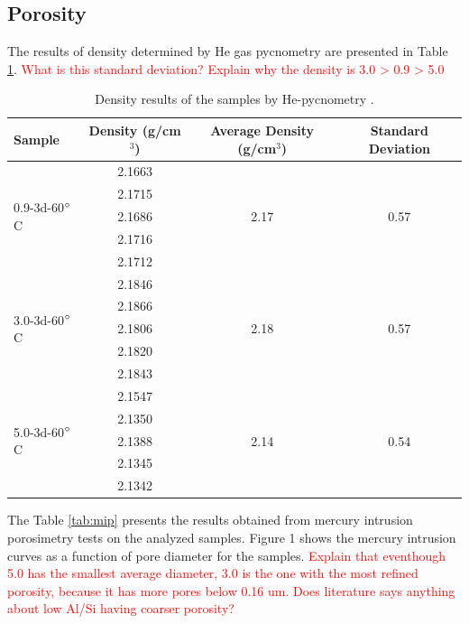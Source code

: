 \subsection{Porosity}

The results of density determined by He gas pycnometry are presented in Table \ref{tab:he_pycnometry}.
\textcolor{red}{What is this standard deviation?}
\textcolor{red}{Explain why the density is 3.0 > 0.9 > 5.0}

\begin{table}[H]
  \centering
  \caption{Density results of the samples by He-pycnometry \label{tab:he_pycnometry}.}
  \begin{tabular}{lccc}
    \hline
    Sample & Density (g/cm$^3$) & Average Density (g/cm$^3$) & Standard Deviation \\ 
    \hline
    \multirow{5}{*}{0.9-3d-60$^{\circ}$C} 
    & 2.1663 & \multirow{5}{*}{2.17} & \multirow{5}{*}{0.57} \\
    & 2.1715 &  &  \\
    & 2.1686 &  &  \\
    & 2.1716 &  &  \\
    & 2.1712 &  &  \\ 
    \hline
    \multirow{5}{*}{3.0-3d-60$^{\circ}$C} 
    & 2.1846 & \multirow{5}{*}{2.18} & \multirow{5}{*}{0.57} \\
    & 2.1866 &  &  \\
    & 2.1806 &  &  \\
    & 2.1820 &  &  \\
    & 2.1843 &  &  \\ 
    \hline
    \multirow{5}{*}{5.0-3d-60$^{\circ}$C} 
    & 2.1547 & \multirow{5}{*}{2.14} & \multirow{5}{*}{0.54} \\
    & 2.1350 &  &  \\
    & 2.1388 &  &  \\
    & 2.1345 &  &  \\
    & 2.1342 &  &  \\ 
    \hline
  \end{tabular}
\end{table}


The Table \ref{tab:mip} presents the results obtained from mercury intrusion porosimetry tests on the analyzed samples.
Figure 1 shows the mercury intrusion curves as a function of pore diameter for the samples.
\textcolor{red}{Explain that eventhough 5.0 has the smallest average diameter, 3.0 is the one with the most refined porosity, because it has more pores below 0.16 um. Does literature says anything about low Al/Si having coarser porosity?}

